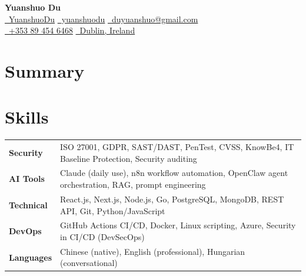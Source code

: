 \documentclass{simpleresume}
\begin{document}
\begin{center}
  {\Large\sffamily\bfseries\color{namecolor} Yuanshuo Du}\\[0.10cm]
  {\sffamily\small
    \href{https://github.com/YuanshuoDu}{\color{accent}\faGithub\color{muted}\ YuanshuoDu}
    \quad\textbullet\quad
    \href{https://linkedin.com/in/yuanshuodu}{\color{accent}\faLinkedin\color{muted}\ yuanshuodu}
    \quad\textbullet\quad
    \href{https://mail.google.com/mail/?view=cm&to=duyuanshuo@gmail.com}{\color{accent}\faEnvelope\color{muted}\ duyuanshuo@gmail.com}
  }\\[0.05cm]
  {\sffamily\small\color{muted}
    \href{tel:+353894546468}{\color{accent}\faPhone\color{muted}\ +353 89 454 6468}
    \quad\textemdash\quad
    \href{https://www.google.com/maps/place/Dublin,+Ireland}{\color{accent}\faMapMarker\ Dublin, Ireland}
  }
\end{center}
\headerrule

\section{Summary}
\vspace{-0.05cm}
\vspace{-0.08cm}

\section{Skills}
\noindent
\begin{tabular}{p{2.4cm}p{14.0cm}}
\textbf{Security} & ISO 27001, GDPR, SAST/DAST, PenTest, CVSS, KnowBe4, IT Baseline Protection, Security auditing \\[-3pt]
\textbf{AI Tools} & Claude (daily use), n8n workflow automation, OpenClaw agent orchestration, RAG, prompt engineering \\[-3pt]
\textbf{Technical} & React.js, Next.js, Node.js, Go, PostgreSQL, MongoDB, REST API, Git, Python/JavaScript \\[-3pt]
\textbf{DevOps} & GitHub Actions CI/CD, Docker, Linux scripting, Azure, Security in CI/CD (DevSecOps) \\[-3pt]
\textbf{Languages} & Chinese (native), English (professional), Hungarian (conversational) \\
\end{tabular}
\vspace{0.03cm}
\end{document}
